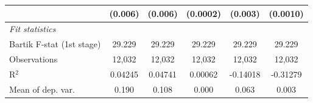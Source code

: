 \begin{tabular}{lccccc}
                                                                  & (0.006)                              & (0.006)                         & (0.0002)                       & (0.003)                           & (0.0010)\\   
   \midrule
   \emph{Fit statistics}\\
   Bartik F-stat (1st stage)                                  & 29.229                               & 29.229                          & 29.229                         & 29.229                            & 29.229\\  
   Observations                                                   & 12,032                               & 12,032                          & 12,032                         & 12,032                            & 12,032\\  
   R$^2$                                                          & 0.04245                              & 0.04741                         & 0.00062                        & -0.14018                          & -0.31279\\  
   Mean of dep. var.                                              & 0.190                                & 0.108                           & 0.000                          & 0.063                             & 0.003\\  
\bottomrule
\end{tabular}
